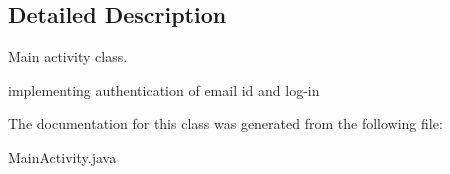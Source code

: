 \subsection{Detailed Description}
Main activity class. 

implementing authentication of email id and log-\/in 

The documentation for this class was generated from the following file\-:\begin{DoxyCompactItemize}
\item 
Main\-Activity.\-java\end{DoxyCompactItemize}
